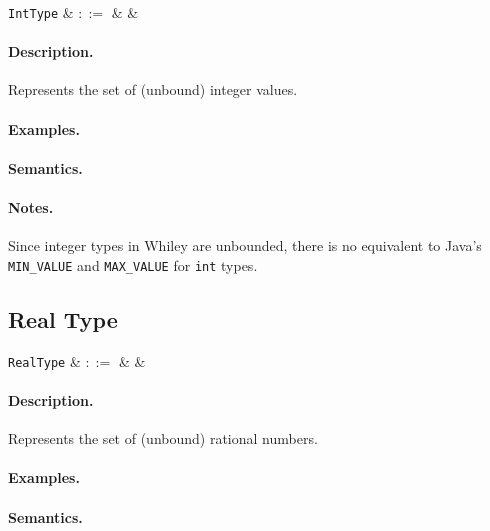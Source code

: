 \begin{syntax}
  \verb+IntType+ & $::=$ &  &\\
\end{syntax}

\paragraph{Description.}  Represents the set of (unbound) integer
values. 

\paragraph{Examples.}

\paragraph{Semantics.}

\paragraph{Notes.}  Since integer types in Whiley are unbounded, there
is no equivalent to Java's \lstinline{MIN_VALUE} and \lstinline{MAX_VALUE} for \lstinline{int} types.


\subsection{Real Type}

\begin{syntax}
  \verb+RealType+ & $::=$ &  &\\
\end{syntax}

\paragraph{Description.}  Represents the set of (unbound) rational
numbers.

\paragraph{Examples.}

\paragraph{Semantics.}

